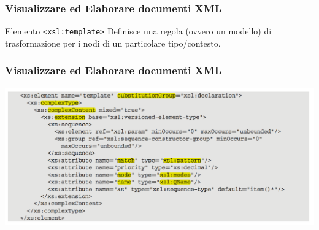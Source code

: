     

    

\begin{frame}
    \frametitle{Visualizzare ed Elaborare documenti XML}
    \addtocounter{nframe}{1}
    

     \begin{block}{Elemento \texttt{<xsl:template>}}
        Definisce una regola (ovvero un modello) di trasformazione per i nodi di un particolare tipo/contesto.
     \end{block}
    
\end{frame}

\begin{frame}
    \frametitle{Visualizzare ed Elaborare documenti XML}
    \addtocounter{nframe}{1}
    
    \begin{center}
        \includegraphics[width=.95\textwidth]{imgs/Schema-template.png}
    \end{center}

\end{frame}

